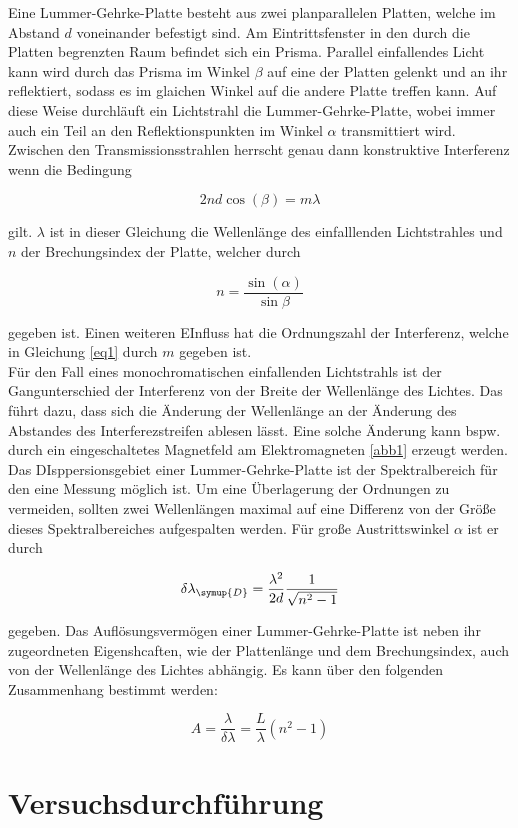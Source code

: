 Eine Lummer-Gehrke-Platte besteht aus zwei planparallelen 
Platten, welche im Abstand $d$ voneinander befestigt sind.
Am Eintrittsfenster in den durch die Platten begrenzten Raum 
befindet sich ein Prisma. Parallel einfallendes Licht kann 
wird durch das Prisma im Winkel $\beta$ auf eine der Platten 
gelenkt und an ihr reflektiert, sodass es im glaichen Winkel 
auf die andere Platte treffen kann. Auf diese Weise durchläuft 
ein Lichtstrahl die Lummer-Gehrke-Platte, wobei immer auch
ein Teil an den Reflektionspunkten im Winkel $\alpha$ transmittiert wird. 
Zwischen den Transmissionsstrahlen herrscht genau dann 
konstruktive Interferenz wenn die Bedingung

\begin{equation}
    2nd \cos(\beta) = m \lambda
    \label{eq1}
\end{equation}

gilt. $\lambda$ ist in dieser Gleichung die Wellenlänge des 
einfalllenden Lichtstrahles und $n$ der Brechungsindex der Platte, 
welcher durch 

\begin{equation}
    n = \frac{\sin(\alpha)}{\sin{\beta}}
    \label{eq2}
\end{equation}

gegeben ist. Einen weiteren EInfluss hat die Ordnungszahl der 
Interferenz, welche in Gleichung \ref{eq1} durch $m$
gegeben ist.\\
Für den Fall eines monochromatischen einfallenden 
Lichtstrahls ist der Gangunterschied der Interferenz von der
Breite der Wellenlänge des Lichtes. 
Das führt dazu, dass sich die Änderung der Wellenlänge an der 
Änderung des Abstandes des Interferezstreifen ablesen lässt.
Eine solche Änderung kann bspw. durch ein eingeschaltetes 
Magnetfeld am Elektromagneten \ref{abb1} erzeugt werden.\\
Das DIsppersionsgebiet einer Lummer-Gehrke-Platte ist 
der Spektralbereich für den eine Messung möglich ist. 
Um eine Überlagerung der Ordnungen zu vermeiden, sollten 
zwei Wellenlängen maximal auf eine Differenz von der 
Größe dieses Spektralbereiches aufgespalten werden. 
Für große Austrittswinkel $\alpha$ ist er durch 

\begin{equation}
    \delta \lambda_{\symup{D}} = \frac{\lambda^2}{2d} \frac{1}{\sqrt{n^2 -1}}
    \label{eq:del_Lam}
\end{equation}

gegeben. Das Auflösungsvermögen einer Lummer-Gehrke-Platte ist 
neben ihr zugeordneten Eigenshcaften, wie der Plattenlänge und 
dem Brechungsindex, auch von der Wellenlänge des Lichtes 
abhängig. Es kann über den folgenden Zusammenhang bestimmt 
werden:

\begin{equation}
    A = \frac{\lambda}{\delta \lambda} = \frac{L}{\lambda}(n^2 -1)
    \label{eq:del_A}
\end{equation}

\section{Versuchsdurchführung}
\label{sec:Versuchsdurchführung}


